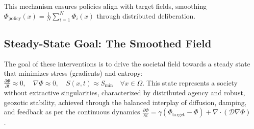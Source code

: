 \documentclass[11pt]{article}
\begin{document}
This mechanism ensures policies align with target fields, smoothing $\Phi_{\text{policy}}(x) = \frac{1}{N} \sum_{i=1}^{N} \Phi_i(x)$ through distributed deliberation.

\subsection{Steady-State Goal: The Smoothed Field}

The goal of these interventions is to drive the societal field towards a steady state that minimizes stress (gradients) and entropy: $\frac{\partial \Phi}{\partial t} \approx 0, \quad \nabla \Phi \approx 0, \quad S(x, t) \approx S_{\text{min}} \quad \forall x \in \Omega$. This state represents a society without extractive singularities, characterized by distributed agency and robust, geozotic stability, achieved through the balanced interplay of diffusion, damping, and feedback as per the continuous dynamics $\frac{\partial \Phi}{\partial t} = \gamma (\Phi_{\text{target}} - \Phi) + \nabla \cdot (\mathcal{D} \nabla \Phi)$.

\newpage


\end{document}
